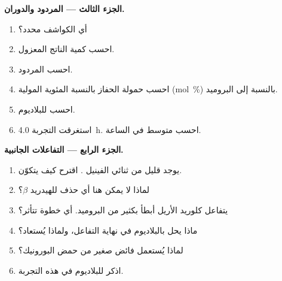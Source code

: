 \begin{problem}
\medskip
\noindent\textbf{الجزء الثالث --- المردود والدوران.}
\begin{enumerate}[resume]
  \item أي الكواشف محدد؟
  \item احسب كمية الناتج المعزول.
  \item احسب المردود.
  \item احسب حمولة الحفاز بالنسبة المئوية المولية (mol~\%) بالنسبة إلى البروميد.
  \item احسب  للبلاديوم.
  \item استغرقت التجربة \qty{4.0}{h}. احسب متوسط  في الساعة.
\end{enumerate}

\medskip
\noindent\textbf{الجزء الرابع --- التفاعلات الجانبية.}
\begin{enumerate}[resume]
  \item يوجد قليل من ثنائي الفينيل . اقترح كيف يتكوّن.
  \item لماذا لا يمكن هنا أي حذف للهيدريد $\beta$؟
  \item يتفاعل كلوريد الأريل أبطأ بكثير من البروميد. أي خطوة تتأثر؟
  \item ماذا يحل بالبلاديوم في نهاية التفاعل، ولماذا يُستعاد؟
  \item لماذا يُستعمل فائض صغير من حمض البورونيك؟
  \item اذكر  للبلاديوم في هذه التجربة.
\end{enumerate}
\end{problem}
